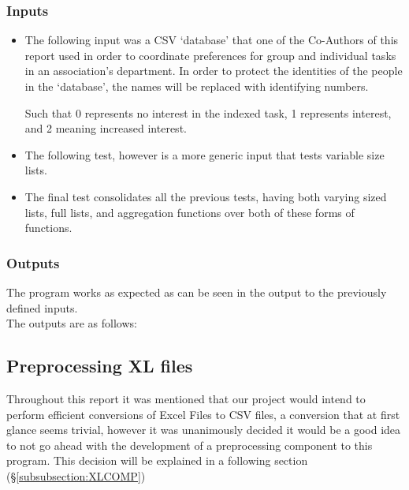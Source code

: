 \documentclass[11pt,a4paper,times]{report}
\begin{document}
\subsubsection{Inputs}
\begin{itemize}
    \item The following input was a CSV `database' that one of the Co-Authors
        of this report used in order to coordinate preferences for group and individual tasks
        in an association's department. In order to protect the identities of the
        people in the `database', the names will be replaced with identifying
        numbers.
    
    Such that 0 represents no interest in the indexed task, 1 represents
    interest, and 2 meaning increased interest.
\item The following test, however is a more generic input that tests 
    variable size lists.
    
\item The final test consolidates all the previous tests, having both
    varying sized lists, full lists, and aggregation functions over
    both of these forms of functions.
    
\end{itemize}
\subsubsection{Outputs}
The program works as expected as can be seen in the output to the
previously defined inputs. \\ The outputs are as follows:



\subsection{Preprocessing XL files}
Throughout this report it was mentioned that our project would intend to 
perform efficient conversions of Excel Files to CSV files, a conversion that
at first glance seems trivial, however it was unanimously decided it would be a
good idea to not go ahead with the development of a preprocessing component to this
program. This decision will be explained in a following section (\S\ref{subsubsection:XLCOMP})
\end{document}
